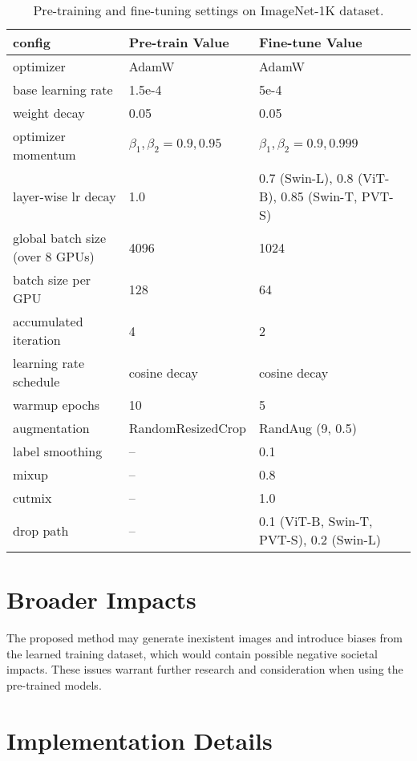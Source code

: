 \documentclass{article}
\begin{document}
\begin{table}
	\vspace{0pt}
    \renewcommand\arraystretch{1.2}
\footnotesize
    \centering
    \resizebox{0.96\textwidth}{!}
    {
        \begin{tabular}{l|l|l}
        \hline
config & Pre-train Value & Fine-tune Value \\\hline
optimizer & AdamW  & AdamW \\
base learning rate & 1.5e-4 & 5e-4\\
weight decay & 0.05 & 0.05 \\
optimizer momentum & $\beta_1, \beta_2{=}0.9, 0.95$  & $\beta_1, \beta_2{=}0.9, 0.999$ \\
layer-wise lr decay & 1.0 & 0.7 (Swin-L), 0.8 (ViT-B), 0.85 (Swin-T, PVT-S) \\
global batch size (over 8 GPUs) & 4096 & 1024 \\
batch size per GPU & 128 & 64\\
accumulated iteration & 4 & 2 \\
learning rate schedule & cosine decay & cosine decay\\
warmup epochs  & 10 & 5 \\
augmentation & RandomResizedCrop &  RandAug (9, 0.5)\\
label smoothing & -- & 0.1 \\
mixup  & -- & 0.8 \\
cutmix  & -- & 1.0 \\
drop path & -- & 0.1 (ViT-B, Swin-T, PVT-S), 0.2 (Swin-L) \\
\hline
        \end{tabular}
    }
	\vspace{2pt}
    \caption{Pre-training and fine-tuning settings on ImageNet-1K dataset.
    }
    \label{table_sm_pretrain_finetune_IN1K}
	\vspace{-16pt}
\end{table}


\section{Broader Impacts}
The proposed method may generate inexistent images and introduce biases from the learned training dataset, which would contain possible negative societal impacts. These issues warrant further research and consideration when using the pre-trained models.


\section{Implementation Details}
\end{document}
